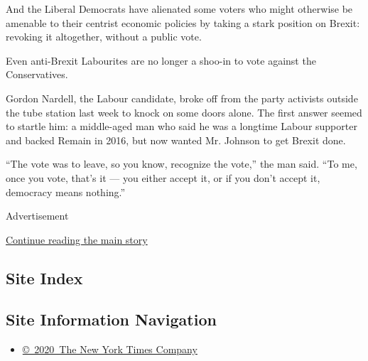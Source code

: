 And the Liberal Democrats have alienated some voters who might otherwise
be amenable to their centrist economic policies by taking a stark
position on Brexit: revoking it altogether, without a public vote.

Even anti-Brexit Labourites are no longer a shoo-in to vote against the
Conservatives.

Gordon Nardell, the Labour candidate, broke off from the party activists
outside the tube station last week to knock on some doors alone. The
first answer seemed to startle him: a middle-aged man who said he was a
longtime Labour supporter and backed Remain in 2016, but now wanted Mr.
Johnson to get Brexit done.

``The vote was to leave, so you know, recognize the vote,'' the man
said. ``To me, once you vote, that's it --- you either accept it, or if
you don't accept it, democracy means nothing.''

Advertisement

\protect\hyperlink{after-bottom}{Continue reading the main story}

\hypertarget{site-index}{%
\subsection{Site Index}\label{site-index}}

\hypertarget{site-information-navigation}{%
\subsection{Site Information
Navigation}\label{site-information-navigation}}

\begin{itemize}
\tightlist
\item
  \href{https://help.nytimes3xbfgragh.onion/hc/en-us/articles/115014792127-Copyright-notice}{©~2020~The
  New York Times Company}
\end{itemize}

